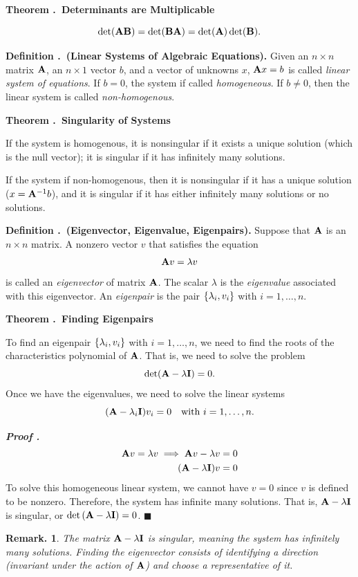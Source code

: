 \documentclass[12pt, a4paper]{article}
\newcounter{index}[subsection]
\newenvironment*{df}[1]{\par\noindent\textbf{Definition \thesubsection.\stepcounter{index}\theindex\ (#1).}}{\par}
\newenvironment*{thm}[1]{\begin{tcolorbox}\par\noindent\textbf{Theorem \thesubsection.\stepcounter{index}\theindex\ #1} \par}{\par\end{tcolorbox}}
\newcounter{nprf}[subsection]
\newenvironment*{prf}{\par\indent\textbf{\textit{Proof \stepcounter{nprf}\thenprf.}}}{\hfill$\blacksquare$\par}
\newtheorem*{rmk}{Remark.}
\def\A{\vb A}
\begin{document}
\begin{thm}{Determinants are Multiplicable}
	\[\det(\A\vb B)=\det(\vb B\A)=\det(\A)\det(\vb B).\]	
\end{thm}
\begin{df}{Linear Systems of Algebraic Equations}
	Given an $n\times n$ matrix $\A$, an $n\times1$ vector $b$, and a vector of unknowns $x$, $\A x=b$ is called \textit{linear system of equations}. If $b=0$, the system if called \textit{homogeneous}. If $b\neq0$, then the linear system is called \textit{non-homogenous}.
\end{df}
\begin{thm}{Singularity of Systems}
	If the system is homogenous, it is nonsingular if it exists a unique solution (which is the null vector); it is singular if it has infinitely many solutions. \par 
	If the system if non-homogenous, then it is nonsingular if it has a unique solution ($x=\A^{-1}b$), and it is singular if it has either infinitely many solutions or no solutions. 
\end{thm}
\begin{df}{Eigenvector, Eigenvalue, Eigenpairs}
	Suppose that $\A$ is an $n\times n$ matrix. A nonzero vector $v$ that satisfies the equation \[\A v=\lambda v\] is called an \textit{eigenvector} of matrix $\A$. The scalar $\lambda$ is the \textit{eigenvalue} associated with this eigenvector. An \textit{eigenpair} is the pair $\qty{\lambda_i,v_i}$ with $i=1,\dots,n$.
\end{df}
\begin{thm}{Finding Eigenpairs}
	To find an eigenpair $\qty{\lambda_i,v_i}$ with $i=1,\dots,n$, we need to find the roots of the characteristics polynomial of $\A$. That is, we need to solve the problem \[\det(\A-\lambda\vb I)=0.\] Once we have the eigenvalues, we need to solve the linear systems \[\qty(\A-\lambda_i\vb I)v_i=0\quad\text{with }i=1,\dots,n.\]
\end{thm}
\begin{prf}
	\begin{align*}\A v=\lambda v\implies\A v-\lambda v&=0\\\qty(\A-\lambda\vb I)v&=0\end{align*} To solve this homogeneous linear system, we cannot have $v=0$ since $v$ is defined to be nonzero. Therefore, the system has infinite many solutions. That is, $\A-\lambda\vb I$ is singular, or $\det\qty(\A-\lambda\vb I)=0$.
\end{prf}
\begin{rmk} The matrix $\A-\lambda\vb I$ is singular, meaning the system has infinitely many solutions. Finding the eigenvector consists of identifying a direction (invariant under the action of $\A$) and choose a representative of it. \end{rmk}
\end{document}
